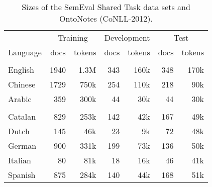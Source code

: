 \documentclass[11pt,a4paper]{article}
\begin{document}
\begin{table}
\centering
\small
\setlength{\tabcolsep}{3.0pt}
\begin{tabular}{l|rr|rr|rr}
& \multicolumn{2}{c|}{Training} & \multicolumn{2}{c|}{Development} & \multicolumn{2}{c}{Test} \\
Language & docs & tokens & docs & tokens & docs & tokens  \\ \hline
\rowcolor{Gray}
\multicolumn{7}{c}{\bf OntoNotes / CoNLL-2012 datasets} \\ 
English & 1940 & 1.3M & 343 & 160k & 348 & 170k   \\
Chinese & 1729 & 750k & 254 & 110k & 218 & 90k\\
Arabic & 359 & 300k & 44 & 30k & 44 & 30k \\ \hline
\rowcolor{Gray}
\multicolumn{7}{c}{\bf SemEval 2010 data} \\
Catalan  & 829  & 253k   & 142& 42k & 167  & 49k\\
Dutch    & 145  & 46k    & 23 & 9k &72 & 48k \\
German   & 900  & 331k   & 199   & 73k &136 & 50k \\
Italian  & 80  &   81k   & 18    & 16k& 46 & 41k \\
Spanish  & 875 & 284k    &140    & 44k& 168 & 51k
\end{tabular}

\caption{\label{tab:datasets} Sizes of the SemEval Shared Task data sets and OntoNotes (CoNLL-2012). }

\end{table}
\end{document}
